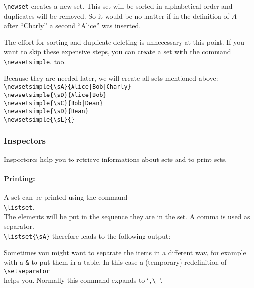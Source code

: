 \verb$\newset$ creates a new set. This set will be sorted in alphabetical order and duplicates will be removed. So it would be no matter if in the definition of $A$ after ``Charly'' a second ``Alice'' was inserted.

The effort for sorting and duplicate deleting is unnecessary at this point. If you want to skip these expensive steps, you can create a set with the command
\verb$\newsetsimple$, too.

Because they are needed later, we will create all sets mentioned above:\\
\mbox{}\hspace{2em}\verb$\newsetsimple{\sA}{Alice|Bob|Charly}$ \\
\mbox{}\hspace{2em}\verb$\newsetsimple{\sD}{Alice|Bob}$ \\
\mbox{}\hspace{2em}\verb$\newsetsimple{\sC}{Bob|Dean}$ \\
\mbox{}\hspace{2em}\verb$\newsetsimple{\sD}{Dean}$ \\
\mbox{}\hspace{2em}\verb$\newsetsimple{\sL}{}$ \newsetsimple{\sL}{}
\subsubsection{Inspectors}\label{inspectors}
Inspectores help you to retrieve informations about sets and to print sets.

\paragraph{Printing:}A set can be printed using the command\\
\mbox{}\hspace{2em}\verb$\listset$.\\
The elements will be put in the sequence they are in the set. A comma is used as separator.\\
\mbox{}\hspace{2em}\verb$\listset{\sA}$ therefore leads to the following output:\\
\centerline{\listset{\sA}}

Sometimes you might want to separate the items in a different way, for example with a \texttt{\&} to put them in a table. In this case a (temporary) redefinition of\\
\mbox{}\hspace{2em}\verb$\setseparator$\\
helps you. Normally this command expands to `\verb*$,\ $'.

